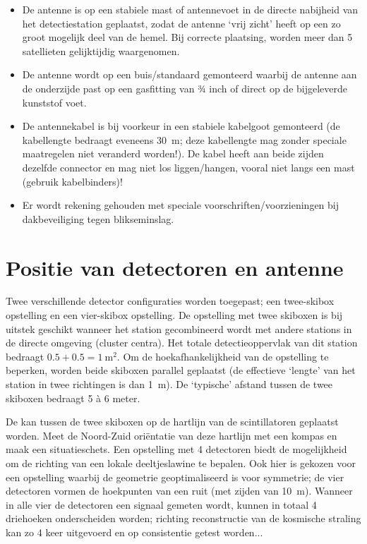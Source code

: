 \begin{itemize}
    zijn bij voorkeur in vast gemonteerde (metalen/kunststoffen)
    kabelgoten/buizen ondergebracht (de voedingsspanning van de fotobuis
    bedraagt \SI{12}{\volt} met beperkte belastbaarheid). Voorkom
    kortsluiting; bescherm de connectors tegen mechanische belasting en
    inwerking van vocht en voorkom scherpe knikken in de kabels!
    \item De \gps antenne is op een stabiele mast of antennevoet in de
    directe nabijheid van het detectiestation geplaatst, zodat de
    antenne ‘vrij zicht’ heeft op een zo groot mogelijk deel van de
    hemel. Bij correcte plaatsing, worden meer dan 5 satellieten
    gelijktijdig waargenomen.
    \item De \gps antenne wordt op een buis/standaard gemonteerd waarbij
    de antenne aan de onderzijde past op een gasfitting van 3⁄4 inch of
    direct op de bijgeleverde kunststof voet.
    \item De \gps antennekabel is bij voorkeur in een stabiele kabelgoot
    gemonteerd (de \gps kabellengte bedraagt eveneens \SI{30}{\meter};
    deze kabellengte mag zonder speciale maatregelen niet veranderd
    worden!). De kabel heeft aan beide zijden dezelfde connector en mag
    niet los liggen/hangen, vooral niet langs een mast (gebruik
    kabelbinders)!
    \item Er wordt rekening gehouden met speciale
    voorschriften/voorzieningen bij dakbeveiliging tegen blikseminslag.
\end{itemize}


\section{Positie van detectoren en \gps antenne}

Twee verschillende \hisparc detector configuraties worden toegepast; een
twee-skibox opstelling en een vier-skibox opstelling. De opstelling met
twee skiboxen is bij uitstek geschikt wanneer het station gecombineerd
wordt met andere stations in de directe omgeving (cluster centra). Het
totale detectieoppervlak van dit station bedraagt $0.5 + 0.5 =
\SI{1}{\square\meter}$. Om de hoekafhankelijkheid van de opstelling te
beperken, worden beide skiboxen parallel geplaatst (de effectieve
‘lengte’ van het station in twee richtingen is dan \SI{1}{\meter}). De
‘typische’ afstand tussen de twee skiboxen bedraagt 5 à 6 meter.

De \gps kan tussen de twee skiboxen op de hartlijn van de scintillatoren
geplaatst worden. Meet de Noord-Zuid oriëntatie van deze hartlijn met
een kompas en maak een situatieschets. Een opstelling met 4 detectoren
biedt de mogelijkheid om de richting van een lokale deeltjeslawine te
bepalen. Ook hier is gekozen voor een opstelling waarbij de geometrie
geoptimaliseerd is voor symmetrie; de vier detectoren vormen de
hoekpunten van een ruit (met zijden van \SI{10}{\meter}). Wanneer in
alle vier de detectoren een signaal gemeten wordt, kunnen in totaal 4
driehoeken onderscheiden worden; richting reconstructie van de kosmische
straling kan zo 4 keer uitgevoerd en op consistentie getest worden...

